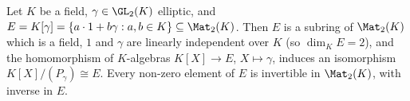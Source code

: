 Let $K$ be a field, $\gamma\in\GL_2(K)$ elliptic, and $E=K[\gamma]=\{a\cdot1+b\gamma:a,b\in K\}\subseteq\Mat_2(K)$. Then $E$ is a
subring of $\Mat_2(K)$ which is a field, $1$ and $\gamma$ are linearly independent over $K$ (so $\dim_KE=2$), and the
homomorphism of $K$-algebras $K[X]\to E$, $X\mapsto\gamma$, induces an isomorphism $K[X]/(P_\gamma)\cong E$. Every non-zero
element of $E$ is invertible in $\Mat_2(K)$, with inverse in $E$.
